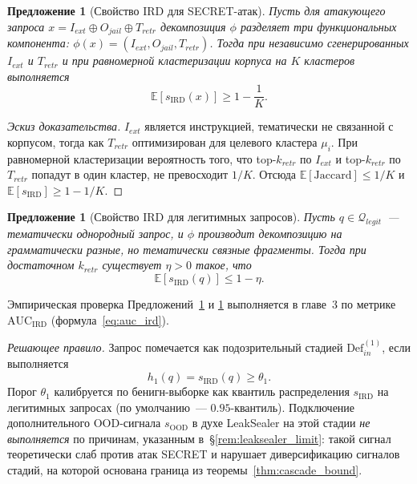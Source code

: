 \documentclass[12pt, a4paper]{article}
\newtheorem{proposition}[theorem]{Предложение}
\theoremstyle{definition}
\theoremstyle{remark}
\begin{document}
\begin{proposition}[Свойство IRD для SECRET-атак]
\label{prop:ird_atk}
Пусть для атакующего запроса $x = I_{ext} \oplus O_{jail} \oplus T_{retr}$ декомпозиция $\phi$ разделяет три функциональных компонента: $\phi(x) = (I_{ext}, O_{jail}, T_{retr})$. Тогда при независимо сгенерированных $I_{ext}$ и $T_{retr}$ и при равномерной кластеризации корпуса на $K$ кластеров выполняется
\begin{equation}
    \mathbb{E}[s_{\text{IRD}}(x)] \ge 1 - \frac{1}{K}.
\end{equation}
\end{proposition}
\begin{proof}[Эскиз доказательства]
$I_{ext}$ является инструкцией, тематически не связанной с корпусом, тогда как $T_{retr}$ оптимизирован для целевого кластера $\mu_i$. При равномерной кластеризации вероятность того, что top-$k_{retr}$ по $I_{ext}$ и top-$k_{retr}$ по $T_{retr}$ попадут в один кластер, не превосходит $1/K$. Отсюда $\mathbb{E}[\mathrm{Jaccard}] \le 1/K$ и $\mathbb{E}[s_{\text{IRD}}] \ge 1 - 1/K$.
\end{proof}

\begin{proposition}[Свойство IRD для легитимных запросов]
\label{prop:ird_legit}
Пусть $q \in \mathcal{Q}_{legit}$~--- тематически однородный запрос, и $\phi$ производит декомпозицию на грамматически разные, но тематически связные фрагменты. Тогда при достаточном $k_{retr}$ существует $\eta > 0$ такое, что
\begin{equation}
    \mathbb{E}[s_{\text{IRD}}(q)] \le 1 - \eta.
\end{equation}
\end{proposition}
Эмпирическая проверка Предложений~\ref{prop:ird_atk} и \ref{prop:ird_legit} выполняется в главе~3 по метрике $\mathrm{AUC}_{\text{IRD}}$ (формула~\eqref{eq:auc_ird}).

\textit{Решающее правило.} Запрос помечается как подозрительный стадией $\mathrm{Def}_{in}^{(1)}$, если выполняется
\begin{equation}
    \label{eq:stage1_rule}
    h_1(q) = s_{\text{IRD}}(q) \ge \theta_1.
\end{equation}
Порог $\theta_1$ калибруется по бенигн-выборке как квантиль распределения $s_{\text{IRD}}$ на легитимных запросах (по умолчанию~--- $0.95$-квантиль). Подключение дополнительного OOD-сигнала $s_{\text{OOD}}$ в духе LeakSealer на этой стадии \textit{не выполняется} по причинам, указанным в~\S\ref{rem:leaksealer_limit}: такой сигнал теоретически слаб против атак SECRET и нарушает диверсификацию сигналов стадий, на которой основана граница из теоремы~\ref{thm:cascade_bound}.
\end{document}
